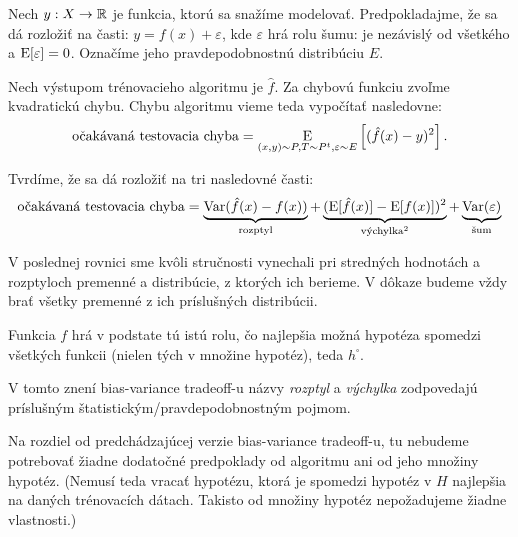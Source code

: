 \begin{theorem}
  Nech $y : X \to \reals$ je funkcia, ktorú sa snažíme modelovať.
  Predpokladajme, že sa dá rozložiť na časti: $y = f(x) + \varepsilon$,
  kde $\varepsilon$ hrá rolu šumu: je nezávislý od všetkého a
  $\E[\varepsilon] = 0$. Označíme jeho pravdepodobnostnú distribúciu
  $E$.
  
  Nech výstupom trénovacieho algoritmu je $\hat{f}$. Za chybovú
  funkciu zvoľme kvadratickú chybu. Chybu algoritmu vieme teda
  vypočítať nasledovne:
  $$\chalg = \E_{(x, y) \sim P, T \sim P^t, \varepsilon \sim E} \left[ (\hat{f}(x) - y)^2 \right].$$
  
  Tvrdíme, že sa dá rozložiť na tri nasledovné časti:
  $$
  \chalg
      = \underbrace{\Var(\hat{f}(x) - f(x))}_{\text{\normalfont rozptyl}}
      + \underbrace{(\E[\hat{f}(x)] - \E[f(x)])^2}_{\text{\normalfont výchylka}^2}
      + \underbrace{\Var(\varepsilon)}_{\text{\normalfont šum}}
  $$
\end{theorem}
\begin{remark}
  V poslednej rovnici sme kvôli stručnosti vynechali pri stredných
  hodnotách a rozptyloch premenné a distribúcie, z ktorých ich berieme.
  V dôkaze budeme vždy brať všetky premenné z ich príslušných distribúcii.
\end{remark}
\begin{remark}
  Funkcia $f$ hrá v podstate tú istú rolu, čo najlepšia možná hypotéza
  spomedzi všetkých funkcii (nielen tých v množine hypotéz), teda $h^\square$.
\end{remark}
\begin{remark}
  V tomto znení bias-variance tradeoff-u názvy \emph{rozptyl} a
  \emph{výchylka} zodpovedajú príslušným štatistickým/pravdepodobnostným
  pojmom.
\end{remark}
\begin{remark}
  Na rozdiel od predchádzajúcej verzie bias-variance tradeoff-u, tu
  nebudeme potrebovať žiadne dodatočné predpoklady od algoritmu ani
  od jeho množiny hypotéz. (Nemusí teda vracať hypotézu, ktorá je
  spomedzi hypotéz v $H$ najlepšia na daných trénovacích dátach.
  Takisto od množiny hypotéz nepožadujeme žiadne vlastnosti.)
\end{remark}

